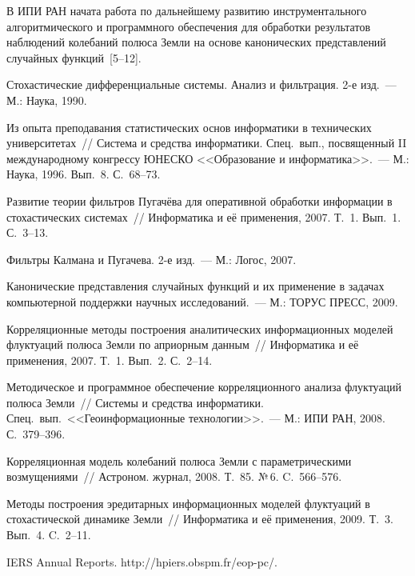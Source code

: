 \begin{multicols}{2}
В ИПИ РАН начата работа по дальнейшему развитию инструментального алгоритмического и 
программного обеспечения для обработки результатов наблюдений колебаний полюса Земли 
на основе канонических представлений случайных функций~[5--12].

{\small\frenchspacing
{%
\begin{thebibliography}{99}
Стохастические дифференциальные системы. Анализ и фильтрация. 2-е изд.~--- М.: Наука, 1990.

Из опыта преподавания статистических основ информатики в технических университетах~// 
Система и средства информатики. Спец.\ вып., посвященный II международному конгрессу \mbox{ЮНЕСКО}
<<Образование и информатика>>.~--- М.: Наука, 1996. Вып.~8. С.~68--73.

Развитие теории фильтров Пугачёва для оперативной обработки информации в стохастических системах~// 
Информатика и её применения, 2007. Т.~1. Вып.~1. С.~3--13.

Фильтры Калмана и Пугачева. 2-е изд.~--- М.: Логос, 2007.

Канонические представления случайных функций и их применение в задачах компьютерной поддержки научных исследований.~--- 
М.: ТОРУС ПРЕСС, 2009.

Корреляционные методы построения аналитических информационных моделей флуктуаций полюса Земли по априорным данным~// 
Информатика и её применения, 2007. Т.~1. Вып.~2. С.~2--14.

Методическое и программное обеспечение корреляционного анализа флуктуаций полюса Земли~// 
Системы и средства информатики. Спец.\ вып.\ <<Геоинформационные технологии>>.~--- М.: ИПИ РАН, 2008. С.~379--396.

Корреляционная модель колебаний полюса Земли с параметрическими возмущениями~// Астроном. журнал, 2008. 
Т.~85. №\,6. C.~566--576.

Методы построения эредитарных информационных моделей флуктуаций в стохастической динамике Земли~// 
Информатика и её применения, 2009. Т.~3. Вып.~4. C.~2--11.

IERS Annual Reports.  {\sf  http://hpiers.obspm.fr/eop-pc/}.


\end{thebibliography}}}
\end{multicols}
